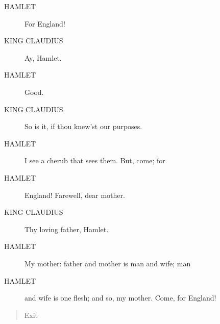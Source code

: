 \documentclass{article}
\begin{document}
\begin{description}
            
\item[HAMLET] For England!
\end{description}
          
\begin{description}
            
\item[KING CLAUDIUS] Ay, Hamlet.
\end{description}
          
\begin{description}
            
\item[HAMLET] Good.
\end{description}
          
\begin{description}
            
\item[KING CLAUDIUS] So is it, if thou knew'st our purposes.
\end{description}
          
\begin{description}
            
\item[HAMLET] I see a cherub that sees them. But, come; for
\item[HAMLET] England! Farewell, dear mother.
\end{description}
          
\begin{description}
            
\item[KING CLAUDIUS] Thy loving father, Hamlet.
\end{description}
          
\begin{description}
            
\item[HAMLET] My mother: father and mother is man and wife; man
\item[HAMLET] and wife is one flesh; and so, my mother. Come, for England!
\end{description}
          
\begin{quote}
Exit
\end{quote}
          
\end{document}
